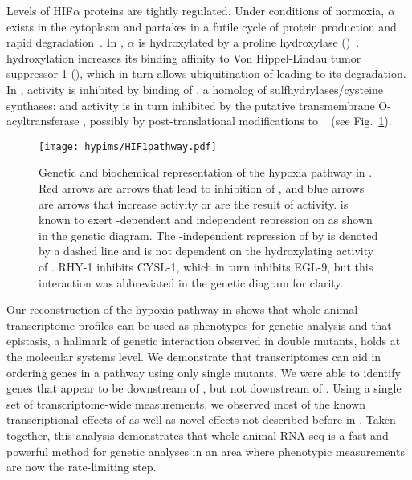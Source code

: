 Levels of HIF$\alpha$ proteins are tightly regulated. Under conditions of
normoxia, \hifp{}$\alpha$ exists in the cytoplasm and partakes in a futile cycle
of protein production and rapid degradation~\citep{Huang1996}. In \cel{},
\hifp{}$\alpha$ is hydroxylated by a proline hydroxylase
(\eglp{})~\citep{Kaelin2008}. \hifp{} hydroxylation increases its binding
affinity to Von Hippel-Lindau tumor suppressor 1 (\vhlp{}), which in turn allows
ubiquitination of \hifp{} leading to its degradation. In \cel{}, \eglp{}
activity is inhibited by binding of \cyslp{}, a homolog of
sulfhydrylases/cysteine synthases; and \cyslp{} activity is in turn inhibited by
the putative transmembrane O-acyltransferase \rhyp{}, possibly by
post-translational modifications to \cyslp{}~\citep{Ma2012} (see
Fig.~\ref{fig:pathway}).

\begin{figure}[tbhp]
  \centering
  \texttt{[image: hypims/HIF1pathway.pdf]}
  \caption{
    Genetic and biochemical representation of the hypoxia pathway in \cel{}. Red
    arrows are arrows that lead to inhibition of \hifp{}, and blue arrows are
    arrows that increase \hifp{} activity or are the result of \hifp{} activity.
    \eglp{} is known to exert \vhlp{}-dependent and independent repression
    on \hifp{} as shown in the genetic diagram. The \vhlp{}-independent
    repression of \hifp{} by \eglp{} is denoted by a dashed line and is not
    dependent on the hydroxylating activity of \eglp{}. RHY-1
    inhibits CYSL-1, which in turn inhibits EGL-9, but this interaction was
    abbreviated in the genetic diagram for clarity.
  }
\label{fig:pathway}
\end{figure}

Our reconstruction of the hypoxia pathway in \cel{} shows that whole-animal
transcriptome profiles can be used as phenotypes for genetic analysis and that
epistasis, a hallmark of genetic interaction observed in double mutants, holds
at the molecular systems level. We demonstrate that transcriptomes can aid in
ordering genes in a pathway using only single mutants. We were able to identify
genes that appear to be downstream of , but not downstream of
. Using a single set of transcriptome-wide measurements, we observed
most of the known transcriptional effects of  as well as novel
effects not described before in \cel{}. Taken together, this analysis
demonstrates that whole-animal RNA-seq is a fast and powerful method for genetic
analyses in an area where phenotypic measurements are now the rate-limiting
step.

